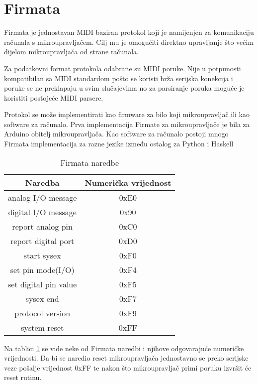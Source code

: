 \newpage
\section{Firmata}

Firmata je jednostavan MIDI baziran protokol koji je namijenjen za komunikaciju
računala s mikroupravljačem. Cilj mu je omogućiti direktno upravljanje što većim
dijelom mikroupravljača od strane računala.

Za podatkovni format protokola odabrane su MIDI \cite{midi} poruke. Nije u
potpunosti kompatibilan sa MIDI standardom pošto se koristi brža serijska
konekcija i poruke se ne preklapaju u svim slučajevima no za parsiranje poruka
moguće je koristiti postojeće MIDI parsere.

Protokol se može implementirati kao firmware za bilo koji mikroupravljač ili kao
software za računalo. Prva implementacija Firmate za mikroupravljače je bila za
Arduino obitelj mikroupravljača. Kao software za računalo postoji mnogo
Firmata implementacija za razne jezike između ostalog za Python \cite{pyfirmata}
i Haskell \cite{harduino}

\begin{table}[h]
\centering
    \begin{tabular}{|c|c|}
        \hline
        Naredba               & Numerička vrijednost \\
        \hline
        analog I/O message    & 0xE0 \\
        \hline
        digital I/O message   & 0x90 \\
        \hline
        report analog pin     & 0xC0 \\
        \hline
        report digital port   & 0xD0 \\
        \hline
        start sysex           & 0xF0 \\
        \hline
        set pin mode(I/O)     & 0xF4 \\
        \hline
        set digital pin value & 0xF5 \\
        \hline
        sysex end             & 0xF7 \\
        \hline
        protocol version      & 0xF9 \\
        \hline
        system reset          & 0xFF \\
        \hline
    \end{tabular}
    \caption{Firmata naredbe}
    \label{tbl:firmata}
\end{table}

Na tablici \ref{tbl:firmata} se vide neke od Firmata naredbi i njihove
odgovarajuće numeričke vrijednosti. Da bi se naredio reset mikroupravljača
jednostavno se preko serijske veze pošalje vrijednost 0xFF te nakon što
mikroupravljač primi poruku izvršit će reset rutinu.


